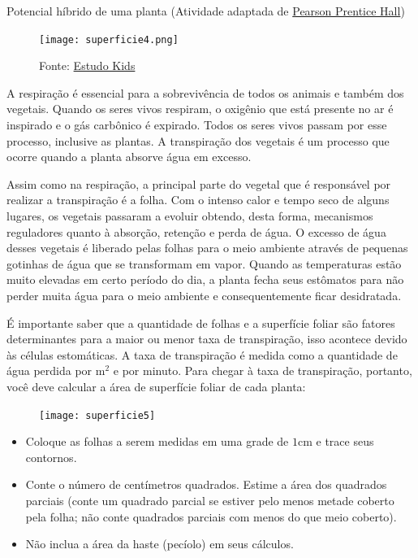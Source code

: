 \begin{task}{Potencial híbrido de uma planta}
(Atividade adaptada de \href{http://www.phschool.com/science/biology_place/labbench/lab9/calcsurf.html}{Pearson Prentice Hall})

\begin{figure}
\centering
  \texttt{[image: superficie4.png]}
  \caption{Fonte: \href{https://www.estudokids.com.br/respiracao-e-transpiracao-dos-vegetais/)}{Estudo Kids}}
\end{figure}  
A respiração é essencial para a sobrevivência de todos os animais e também dos vegetais. Quando os seres vivos respiram, o oxigênio que está presente no ar é inspirado e o gás carbônico é expirado. Todos os seres vivos passam por esse processo, inclusive as plantas. A transpiração dos vegetais é um processo que ocorre quando a planta absorve água em excesso. 

Assim como na respiração, a principal parte do vegetal que é responsável por realizar a transpiração é a folha. Com o intenso calor e tempo seco de alguns lugares, os vegetais passaram a evoluir obtendo, desta forma, mecanismos reguladores quanto à absorção, retenção e perda de água. O excesso de água desses vegetais é liberado pelas folhas para o meio ambiente através de pequenas gotinhas de água que se transformam em vapor. Quando as temperaturas estão muito elevadas em certo período do dia, a planta fecha seus estômatos para não perder muita água para o meio ambiente e consequentemente ficar desidratada.

É importante saber que a quantidade de folhas e a superfície foliar são fatores determinantes para a maior ou menor taxa de transpiração, isso acontece devido às células estomáticas. A taxa de transpiração é medida como a quantidade de água perdida por m$^2$ e por minuto. Para chegar à taxa de transpiração, portanto, você deve calcular a área de superfície foliar de cada planta: 

\begin{figure}[H]
\centering

\texttt{[image: superficie5]}

\end{figure}

\begin{itemize}
  \item Coloque as folhas a serem medidas em uma grade de $1$cm e trace seus contornos.
  \item Conte o número de centímetros quadrados. Estime a área dos quadrados parciais (conte um quadrado parcial se estiver pelo menos metade coberto pela folha; não conte quadrados parciais com menos do que meio coberto).
  \item Não inclua a área da haste (pecíolo) em seus cálculos.
\end{itemize}


\end{task}

